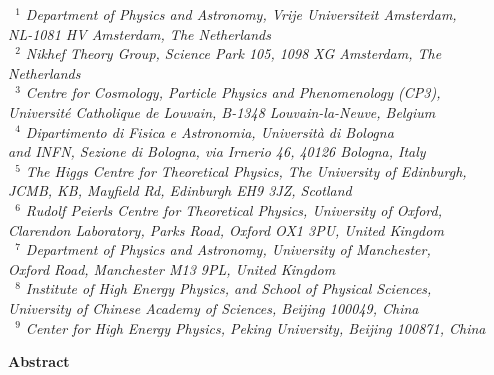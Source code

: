 \documentclass[11pt,a4paper]{article}
\def\[{\left[}
\let\originalleft\left
\renewcommand{\left}{\mathopen{}\mathclose\bgroup\originalleft}
\numberwithin{equation}{section}
\numberwithin{figure}{section}
\numberwithin{table}{section}
\begin{document}
\begin{titlepage}
\begin{center}
\vspace{0.7cm}
{\it \small
~$^1$ Department of Physics and Astronomy, Vrije Universiteit Amsterdam,\\ NL-1081 HV Amsterdam, The Netherlands\\[0.1cm]
 ~$^2$  Nikhef Theory Group, Science Park 105, 1098 XG Amsterdam, The Netherlands\\[0.1cm]
~$^3$ Centre for Cosmology, Particle Physics and Phenomenology (CP3),\\
  Universit\'e Catholique de Louvain, B-1348 Louvain-la-Neuve, Belgium\\[0.1cm]
~$^4$
Dipartimento di Fisica e Astronomia, Universit\`a di Bologna \\and INFN, Sezione di Bologna, 
via Irnerio 46, 40126 Bologna, Italy\\[0.1cm]
~$^5$
The Higgs Centre for Theoretical Physics, The University of Edinburgh,\\
JCMB, KB, Mayfield Rd, Edinburgh EH9 3JZ, Scotland\\[0.1cm]
~$^6$ Rudolf Peierls Centre for Theoretical Physics, University of Oxford, \\
  Clarendon Laboratory, Parks Road, Oxford OX1 3PU, United Kingdom\\[0.1cm]
~$^7$ Department of Physics and Astronomy, University of Manchester, \\Oxford Road, Manchester M13 9PL, United Kingdom\\[0.05cm]
~$^8$ Institute of High Energy Physics, and School of Physical Sciences,\\
University of Chinese Academy of Sciences, Beijing 100049, China\\[0.05cm]
~$^9$ Center for High Energy Physics, Peking University, Beijing 100871, China
}

\vspace{0.7cm}

{\bf \large Abstract}

\end{center}


\end{titlepage}
\end{document}
